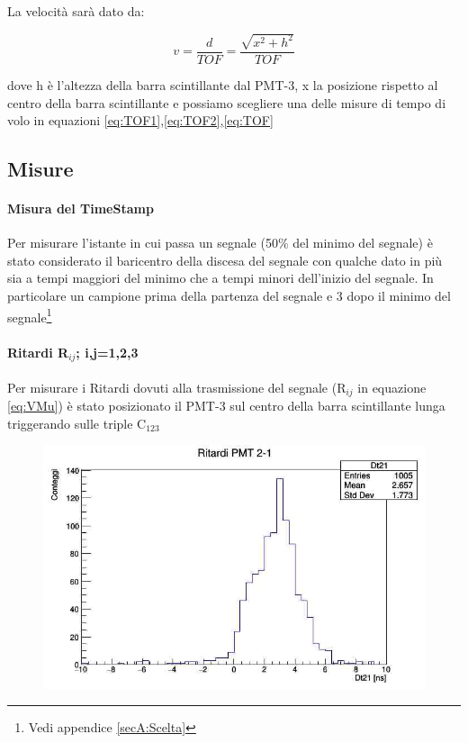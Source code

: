 \documentclass[a4paper]{article}
\begin{document}
La velocità sarà dato da:

\begin{equation}
v = \frac{d}{TOF} = \frac{\sqrt{x^2+h^2}}{TOF}
\label{eq:VMu}
\end{equation}

dove h è l'altezza della barra scintillante dal PMT-3, x la posizione rispetto al centro della barra scintillante e possiamo scegliere una delle misure di tempo di volo in equazioni \ref{eq:TOF1},\ref{eq:TOF2},\ref{eq:TOF}

\subsection{Misure}
\label{sec:MisureV}
\paragraph{Misura del TimeStamp}
Per misurare l'istante in cui passa un segnale (50$\%$ del minimo del segnale) è stato considerato il baricentro della discesa del segnale con qualche dato in più sia a tempi maggiori del minimo che a tempi minori dell'inizio del segnale. In particolare un campione prima della partenza del segnale e 3 dopo il minimo del segnale\footnote{Vedi appendice \ref{secA:Scelta}}

\paragraph{Ritardi R$_{ij}$; i,j=1,2,3}
Per misurare i Ritardi dovuti alla trasmissione del segnale (R$_{ij}$ in equazione \ref{eq:VMu}) è stato posizionato il PMT-3 sul centro della barra scintillante lunga triggerando sulle triple C$_{123}$

\begin{figure}[H]
\centering
\includegraphics[scale=0.3]{./immagini/TimeOfFlight/Rit21Fore.jpg}
\caption{}
\label{fig:Dt21Fore}
\end{figure}
\end{document}
